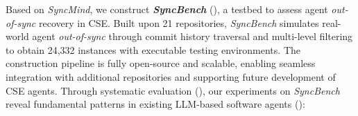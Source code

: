 Based on \textit{SyncMind}, we construct \textbf{\textit{SyncBench}} (), a testbed to assess agent \textit{out-of-sync} recovery in CSE.
% 
Built upon 21 \github repositories, \textit{SyncBench} simulates real-world agent \textit{out-of-sync} through commit history traversal and multi-level filtering to obtain 24,332 instances with executable testing environments.
The construction pipeline is fully open-source and scalable, enabling seamless integration with additional repositories and supporting future development of CSE agents.
% 
%
%
%
%
%
%
Through systematic evaluation (), our experiments on \textit{SyncBench} reveal fundamental patterns in existing LLM-based software agents ():


